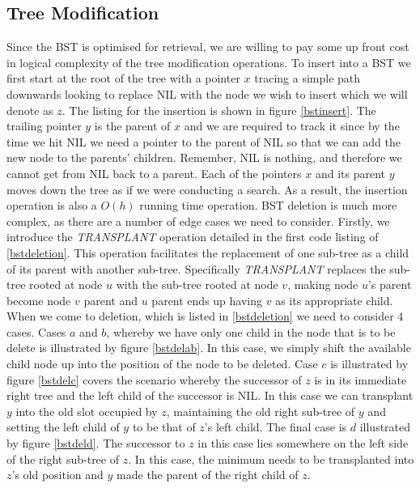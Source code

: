 \documentclass[10pt,a4paper]{article}
\begin{document}
\subsection{Tree Modification}
Since the BST is optimised for retrieval, we are willing to pay some up front cost in logical complexity of the tree modification operations. To insert into a BST we first start at the root of the tree with a pointer $x$ tracing a simple path downwards looking to replace NIL with the node we wish to insert which we will denote as $z$. The listing for the insertion is shown in figure \ref{bstinsert}. The trailing pointer $y$ is the parent of $x$ and we are required to track it since by the time we hit NIL we need a pointer to the parent of NIL so that we can add the new node to the parents' children. Remember, NIL is nothing, and therefore we cannot get from NIL back to a parent. Each of the pointers $x$ and its parent $y$ moves down the tree as if we were conducting a search. As a result, the insertion operation is also a $O(h)$ running time operation. 
\newline\newline
BST deletion is much more complex, as there are a number of edge cases we need to consider. Firstly, we introduce the {\it TRANSPLANT} operation detailed in the first code listing of \ref{bstdeletion}. This operation facilitates the replacement of one sub-tree as a child of its parent with another sub-tree. Specifically {\it TRANSPLANT} replaces the sub-tree rooted at node $u$ with the sub-tree rooted at node $v$, making node $u$'s parent become node $v$ parent and $u$ parent ends up having $v$ as its appropriate child. 
\newline\newline
When we come to deletion, which is listed in \ref{bstdeletion} we need to consider 4 cases. Cases $a$ and $b$, whereby we have only one child in the node that is to be delete is illustrated by figure \ref{bstdelab}. In this case, we simply shift the available child node up into the position of the node to be deleted. Case $c$ is illustrated by figure \ref{bstdelc} covers the scenario whereby the successor of $z$ is in its immediate right tree and the left child of the successor is NIL. In this case we can transplant $y$ into the old slot occupied by $z$, maintaining the old right sub-tree of $y$ and setting the left child of $y$ to be that of $z$'s left child. The final case is $d$ illustrated by figure \ref{bstdeld}. The successor to $z$ in this case lies somewhere on the left side of the right sub-tree of $z$. In this case, the minimum needs to be transplanted into $z$'s old position and $y$ made the parent of the right child of $z$. 
\end{document}
